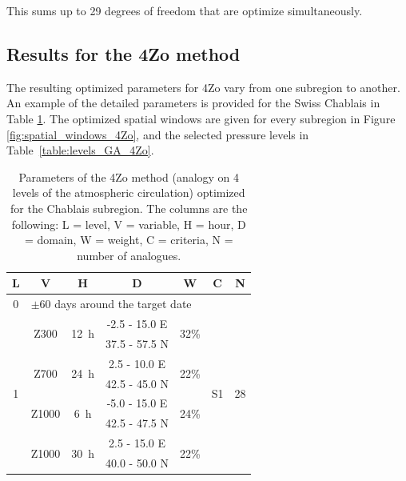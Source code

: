 \documentclass[5p]{elsarticle}
\begin{document}
This sums up to 29 degrees of freedom that are optimize simultaneously.


\subsection{Results for the 4Zo method}

The resulting optimized parameters for 4Zo vary from one subregion to another. An example of the detailed parameters is provided for the Swiss Chablais in Table \ref{table:params_GA_4Zo}. The optimized spatial windows are given for every subregion in Figure \ref{fig:spatial_windows_4Zo}, and the selected pressure levels in Table~\ref{table:levels_GA_4Zo}. 

\begin{table}[htbp]
	\caption{Parameters of the 4Zo method (analogy on 4 levels of the atmospheric circulation) optimized for the Chablais subregion. The columns are the following: L = level, V = variable, H = hour, D = domain, W = weight, C = criteria, N = number of analogues.}
	\footnotesize
	\begin{center}
		\begin{tabular}{ccccccc}
			\hline L & V & H & D & W & C & N \\ 
			\hline 
			0 & \multicolumn{6}{l}{$\pm 60$ days around the target date} \\
			\hline 
			\multirow{8}{*}{1} &  \multirow{2}{*}{Z300} & \multirow{2}{*}{12~h} & -2.5 - 15.0 \degree E & \multirow{2}{*}{32\%} & \multirow{8}{*}{S1} & \multirow{8}{*}{28} \\
			& & & 37.5 - 57.5 \degree N & & & \\ 
			& \multirow{2}{*}{Z700} & \multirow{2}{*}{24~h} & 2.5 - 10.0 \degree E & \multirow{2}{*}{22\%} & & \\ 
			& & & 42.5 - 45.0 \degree N & & & \\ 
			& \multirow{2}{*}{Z1000} & \multirow{2}{*}{6~h} & -5.0 - 15.0 \degree E & \multirow{2}{*}{24\%} & & \\ 
			& & & 42.5 - 47.5 \degree N & & & \\ 
			& \multirow{2}{*}{Z1000} & \multirow{2}{*}{30~h} & 2.5 - 15.0 \degree E & \multirow{2}{*}{22\%} & & \\ 
			& & & 40.0 - 50.0 \degree N & & & \\ 
			\hline 
		\end{tabular} 
	\end{center}
	\label{table:params_GA_4Zo}
\end{table}
\end{document}

